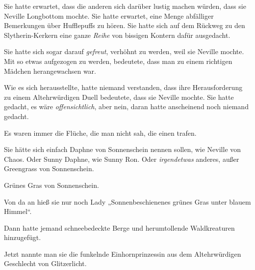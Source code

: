 Sie hatte erwartet, dass die anderen sich darüber lustig machen würden, dass sie Neville Longbottom mochte. Sie hatte erwartet, eine Menge abfälliger Bemerkungen über Hufflepuffs zu hören. Sie hatte sich auf dem Rückweg zu den Slytherin-Kerkern eine ganze \emph{Reihe} von bissigen Kontern dafür ausgedacht.

Sie hatte sich sogar darauf \emph{gefreut}, verhöhnt zu werden, weil sie Neville mochte. Mit so etwas aufgezogen zu werden, bedeutete, dass man zu einem richtigen Mädchen herangewachsen war.

Wie es sich herausstellte, hatte niemand verstanden, dass ihre Herausforderung zu einem Altehrwürdigen Duell bedeutete, dass sie Neville mochte. Sie hatte gedacht, es wäre \emph{offensichtlich}, aber nein, daran hatte anscheinend noch niemand gedacht.

Es waren immer die Flüche, die man nicht sah, die einen trafen.

Sie hätte sich einfach Daphne von Sonnenschein nennen sollen, wie Neville von Chaos. Oder Sunny Daphne, wie Sunny Ron. Oder \emph{irgendetwas} anderes, außer Greengrass von Sonnenschein.

Grünes Gras von Sonnenschein.

Von da an hieß sie nur noch Lady
„Sonnenbeschienenes grünes Gras unter blauem Himmel“.

Dann hatte jemand schneebedeckte Berge und herumtollende Waldkreaturen hinzugefügt.

Jetzt nannte man sie die funkelnde Einhornprinzessin aus dem Altehrwürdigen Geschlecht von Glitzerlicht.

